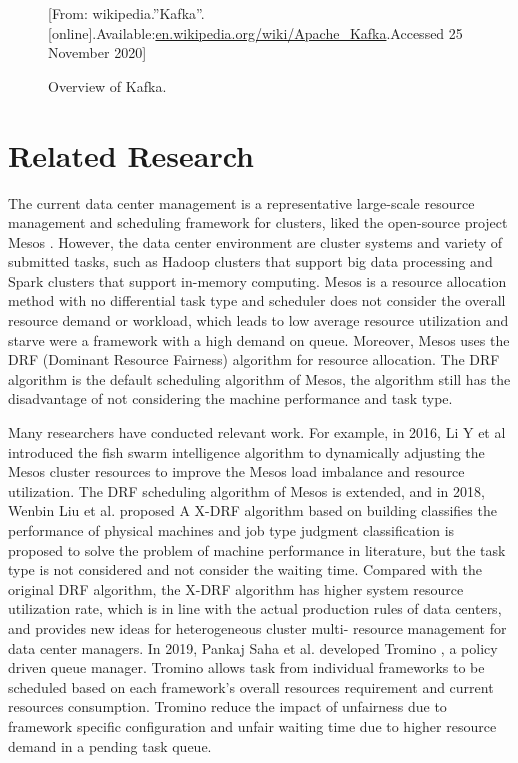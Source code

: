 \documentclass[12pt,oneside,openright,a4paper]{cpe-english-project}
\begin{document}
\begin{figure}[!h]\centering
  \setlength{\fboxrule}{0mm} %
  \setlength{\fboxsep}{0cm}
  \caption{Overview of Kafka.}\label{fig:kafka}
  [From: wikipedia.''Kafka''.[online].Available:\url{en.wikipedia.org/wiki/Apache_Kafka}.Accessed 25 November 2020]
\end{figure}

\section{Related Research}
The current data center management is a representative large-scale resource management and scheduling framework for clusters, liked the open-source project Mesos \cite{mesosInAction}. However, the data center environment are cluster systems and variety of submitted tasks, such as Hadoop clusters that support big data processing and Spark clusters that support in-memory computing. Mesos is a resource allocation method with no differential task type and scheduler does not consider the overall resource demand or workload, which leads to low average resource utilization and starve were a framework with a high demand on queue. Moreover, Mesos uses the DRF (Dominant Resource Fairness) algorithm for resource allocation. The DRF algorithm is the default scheduling algorithm of Mesos, the algorithm still has the disadvantage of not considering the machine performance and task type.

Many researchers have conducted relevant work. For example, in 2016, Li Y et al \cite{fishSwarm} introduced the fish swarm intelligence algorithm to dynamically adjusting the Mesos cluster resources to improve the Mesos load imbalance and resource utilization. The DRF scheduling algorithm of Mesos is extended, and in 2018, Wenbin Liu et al. proposed A X-DRF algorithm \cite{xdrf} based on building classifies the performance of physical machines and job type judgment classification is proposed to solve the problem of machine performance in literature, but the task type is not considered and not consider the waiting time. Compared with the original DRF algorithm, the X-DRF algorithm has higher system resource utilization rate, which is in line with the actual production rules of data centers, and provides new ideas for heterogeneous cluster multi- resource management for data center managers. In 2019, Pankaj Saha et al. developed Tromino \cite{tromino}, a policy driven queue manager. Tromino allows task from individual frameworks to be scheduled based on each framework’s overall resources requirement and current resources consumption. Tromino reduce the impact of unfairness due to framework specific configuration and unfair waiting time due to higher resource demand in a pending task queue.
\end{document}
